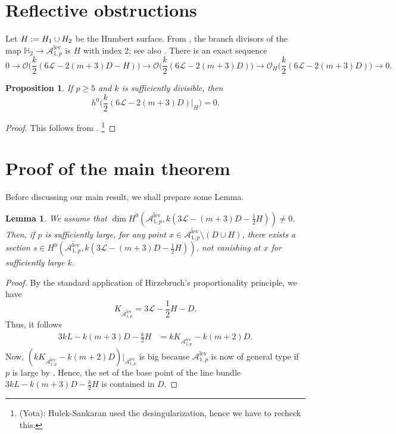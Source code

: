 \documentclass[12pt, pdftex]{amsart}
\theoremstyle{plain}
\newtheorem{lem}[thm]{Lemma}
\newtheorem{prop}[thm]{Proposition}
\theoremstyle{definition}
\numberwithin{equation}{section}
\def\A{{\mathbb A}}
\def\dim{\mathop{\mathrm{dim}}\nolimits}
\def\lev{\mathrm{lev}}
\def\L{\mathscr{L}}
\def\OO{\mathscr{O}}
\def\A{\mathcal{A}}
\newcommand{\defeq}{\vcentcolon=}
\newcommand{\marg}[1]{\normalsize{{\color{red}\footnote{#1}}}{\marginpar[\vskip -.3cm {\color{red}\hfill\tiny{\thefootnote}\normalsize$\implies$}]{\vskip -.3cm{ \color{red}$\impliedby$\tiny\thefootnote}}}}
\newcommand{\Yota}[1]{\marg{\color{blue}(Yota): #1}}
\begin{document}
\section{Reflective obstructions}
Let $H\defeq H_1\cup H_2$ be the Humbert surface.
From \cite{Go61a, Go61b, Ue71}, the branch divisors of the map $\mathbb{H}_2\to\A_{1,p}^{\lev}$ is $H$ with index 2; see also \cite[Section 2]{HKW93}.
There is an exact sequence 
\[0\to \OO\bigl(\frac{k}{2}(6\L - 2(m+3)D - H)\bigr)\to \OO\bigl(\frac{k}{2}(6\L - 2(m+3)D)\bigr)\to \OO_H\bigl(\frac{k}{2}(6\L - 2(m+3)D)\bigr)\to 0.\]

\begin{prop}
\label{prop:reflective_obstruction}
If $p\geq 5$ and $k$ is sufficiently divisible, then
    \[h^0\bigl(\frac{k}{2}(6\L - 2(m+3)D)\vert_H\bigr)=0.\]
\end{prop}
\begin{proof}
    This follows from \cite[Theorem 4.19, 4.25]{HS94}.
    \Yota{Hulek-Sankaran used the desingularization, hence we have to recheck this.}
\end{proof}

\section{Proof of the main theorem}
Before discussing our main result, we shall prepare some Lemma.

\begin{lem}
\label{lem:base_point}
    We assume that $\dim H^0(\overline{\A_{1,p}^{\lev}}, k(3\L-(m+3)D-\frac{1}{2}H))\neq 0$.
    Then, if $p$ is sufficiently large, for any point $x\in \overline{\A_{1,p}^{\lev}}\setminus (D\cup H)$, there exists a section $s\in H^0(\overline{\A_{1,p}^{\lev}}, k(3\L-(m+3)D-\frac{1}{2}H))$, not vanishing at $x$ for sufficiently large $k$.
\end{lem}
\begin{proof}
By the standard application of Hirzebruch's proportionality principle, we have
\[K_{\overline{\A^{\lev}_{1,p}}} = 3\L -\frac{1}{2}H-D.\]
Thus, it follows 
\begin{align*}
3k L-k(m+3)D-\frac{k}{2}H&=k K_{\overline{\A^{\lev}_{1,p}}}-k(m+2)D.
\end{align*}
Now, $(kK_{\overline{\A^{\lev}_{1,p}}}-k(m+2)D)\vert_{\A^{\lev}_{1,p}}$ is big because $\A^{\lev}_{1,p}$ is now of general type if $p$ is large by \cite{HS94}.
Hence, the set of the base point of the line bundle $3k L-k(m+3)D-\frac{k}{2}H$ is contained in $D$.
\end{proof}
\end{document}
